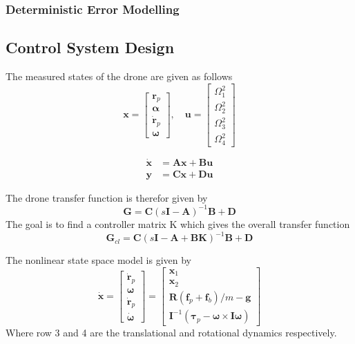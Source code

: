 \documentclass{article}
\begin{document}
\subsubsection{Deterministic Error Modelling}


\subsection{Control System Design}

The measured states of the drone are given as follows
\begin{equation}
    \mathbf{x} = \begin{bmatrix} \mathbf{r}_p \\ \boldsymbol{\alpha} \\ \mathbf{\dot{r}}_p \\  \boldsymbol{\omega}  \end{bmatrix}, \quad \mathbf{u} = \begin{bmatrix} \Omega_1^2 \\ \Omega_2^2 \\ \Omega_3^2 \\ \Omega_4^2 \end{bmatrix}
\end{equation}

\begin{align}
    \mathbf{\dot{x}} &= \mathbf{Ax} + \mathbf{Bu} \\
    \mathbf{y} &= \mathbf{Cx} + \mathbf{Du}
\end{align}

The drone transfer function is therefor given by
\begin{equation}
    \mathbf{G} = \mathbf{C} (s\mathbf{I} - \mathbf{A})^{-1} \mathbf{B} + \mathbf{D}
\end{equation}
The goal is to find a controller matrix K which gives the overall transfer function
\begin{equation}
    \mathbf{G}_{cl} = \mathbf{C} (s\mathbf{I} - \mathbf{A} + \mathbf{BK})^{-1} \mathbf{B} + \mathbf{D}
\end{equation}


The nonlinear state space model is given by
\begin{equation}
    \mathbf{\dot{x}} = \begin{bmatrix}
        \mathbf{\dot{r}}_p \\
        \boldsymbol{\omega} \\
        \mathbf{\dot{r}}_p \\
        \boldsymbol{\dot{\omega}}
    \end{bmatrix} = \begin{bmatrix}
        \mathbf{x}_1 \\
        \mathbf{x}_2 \\
        \mathbf{R}(\mathbf{f}_p + \mathbf{f}_b) / m - \mathbf{g} \\
        \mathbf{I}^{-1} (\boldsymbol{\tau}_p - \boldsymbol{\omega} \times \mathbf{I} \boldsymbol{\omega})
    \end{bmatrix}
\end{equation}
Where row 3 and 4 are the translational and rotational dynamics respectively.
\end{document}
